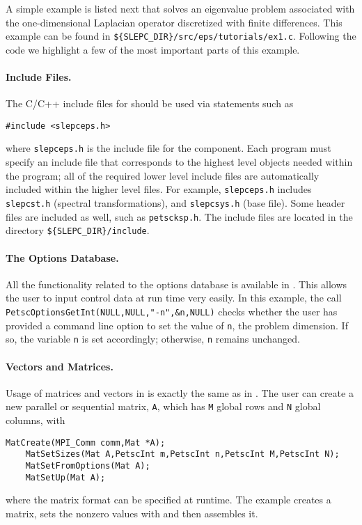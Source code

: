 	A simple example is listed next that solves an eigenvalue problem associated with the one-dimensional Laplacian operator discretized with finite differences. This example can be found in \Verb!${SLEPC_DIR}/src/eps/tutorials/ex1.c!. Following the code we highlight a few of the most important parts of this example.


\paragraph{Include Files.}

The C/C++ include files for \slepc should be used via statements such as
	\begin{Verbatim}[fontsize=\small]
	#include <slepceps.h>
	\end{Verbatim}
where \Verb!slepceps.h! is the include file for the  component. Each \slepc program must specify an include file that corresponds to the highest level \slepc objects needed within the program; all of the required lower level include files are automatically included within the higher level files. For example, \Verb!slepceps.h! includes \Verb!slepcst.h! (spectral transformations), and \Verb!slepcsys.h! (base \slepc file). Some \petsc header files are included as well, such as \Verb!petscksp.h!. The \slepc include files are located in the directory \Verb!${SLEPC_DIR}/include!.

\paragraph{The Options Database.}

All the \petsc functionality related to the options database is available in \slepc. This allows the user to input control data at run time very easily. In this example, the call \Verb!PetscOptionsGetInt(NULL,NULL,"-n",&n,NULL)! checks whether the user has provided a command line option to set the value of \Verb!n!, the problem dimension.  If so, the variable \Verb!n! is set accordingly; otherwise, \Verb!n! remains unchanged.

\paragraph{Vectors and Matrices.}

Usage of matrices and vectors in \slepc is exactly the same as in \petsc. The user can create a new parallel or sequential matrix, \texttt{A}, which has \texttt{M} global rows and \texttt{N} global columns, with
	\begin{Verbatim}[fontsize=\small]
	MatCreate(MPI_Comm comm,Mat *A);
	MatSetSizes(Mat A,PetscInt m,PetscInt n,PetscInt M,PetscInt N);
	MatSetFromOptions(Mat A);
	MatSetUp(Mat A);
	\end{Verbatim}
where the matrix format can be specified at runtime. The example creates a matrix, sets the nonzero values with  and then assembles it.

